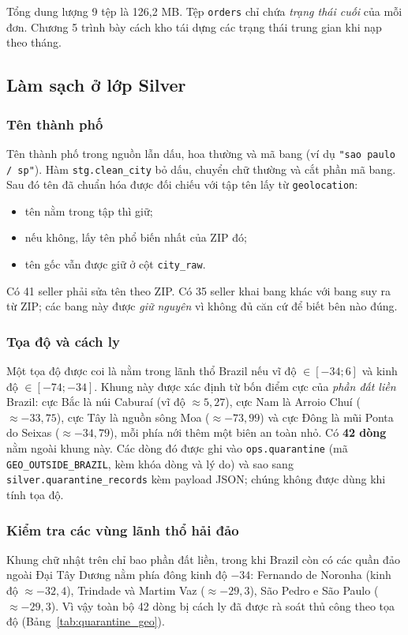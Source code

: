 Tổng dung lượng 9 tệp là 126,2 MB. Tệp \texttt{orders} chỉ chứa \emph{trạng thái cuối} của mỗi đơn. Chương 5 trình bày cách kho tái dựng các trạng thái trung gian khi nạp theo tháng.

\subsection{Làm sạch ở lớp Silver}
\subsubsection*{Tên thành phố}
Tên thành phố trong nguồn lẫn dấu, hoa thường và mã bang (ví dụ \texttt{"sao paulo / sp"}). Hàm \texttt{stg.clean\_city} bỏ dấu, chuyển chữ thường và cắt phần mã bang. Sau đó tên đã chuẩn hóa được đối chiếu với tập tên lấy từ \texttt{geolocation}:
\begin{itemize}
    \item tên nằm trong tập thì giữ;
    \item nếu không, lấy tên phổ biến nhất của ZIP đó;
    \item tên gốc vẫn được giữ ở cột \texttt{city\_raw}.
\end{itemize}
Có 41 seller phải sửa tên theo ZIP. Có 35 seller khai bang khác với bang suy ra từ ZIP; các bang này được \emph{giữ nguyên} vì không đủ căn cứ để biết bên nào đúng.

\subsubsection*{Tọa độ và cách ly}
Một tọa độ được coi là nằm trong lãnh thổ Brazil nếu vĩ độ $\in [-34; 6]$ và kinh độ $\in [-74; -34]$. Khung này được xác định từ bốn điểm cực của \emph{phần đất liền} Brazil: cực Bắc là núi Caburaí (vĩ độ $\approx 5{,}27$), cực Nam là Arroio Chuí ($\approx -33{,}75$), cực Tây là nguồn sông Moa ($\approx -73{,}99$) và cực Đông là mũi Ponta do Seixas ($\approx -34{,}79$), mỗi phía nới thêm một biên an toàn nhỏ. Có \textbf{42 dòng} nằm ngoài khung này. Các dòng đó được ghi vào \texttt{ops.quarantine} (mã \texttt{GEO\_OUTSIDE\_BRAZIL}, kèm khóa dòng và lý do) và sao sang \texttt{silver.quarantine\_records} kèm payload JSON; chúng không được dùng khi tính tọa độ.

\subsubsection*{Kiểm tra các vùng lãnh thổ hải đảo}
Khung chữ nhật trên chỉ bao phần đất liền, trong khi Brazil còn có các quần đảo ngoài Đại Tây Dương nằm phía đông kinh độ $-34$: Fernando de Noronha (kinh độ $\approx -32{,}4$), Trindade và Martim Vaz ($\approx -29{,}3$), São Pedro e São Paulo ($\approx -29{,}3$). Vì vậy toàn bộ 42 dòng bị cách ly đã được rà soát thủ công theo tọa độ (Bảng~\ref{tab:quarantine_geo}).

